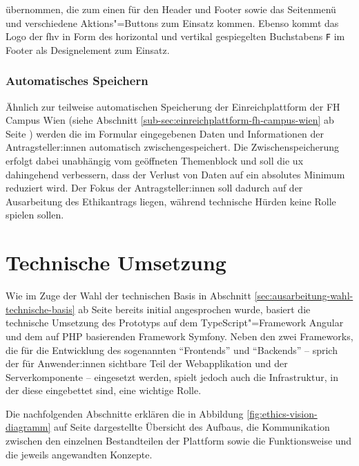 \documentclass[a4paper,12pt,twoside,numbers=noendperiod]{scrreprt}
\begin{document}
\noindent übernommen, die zum einen für den Header und Footer sowie das Seitenmenü und verschiedene Aktions"=Buttons zum Einsatz kommen. Ebenso kommt das Logo der \ac{fhv} in Form des horizontal und vertikal gespiegelten Buchstabens \texttt{F} im Footer als Designelement zum Einsatz.

\subsubsection*{Automatisches Speichern}
 \label{sub-sub-sec:automatsiches-speichern}

 Ähnlich zur teilweise automatischen Speicherung der Einreichplattform der FH Campus Wien (siehe Abschnitt \ref{sub-sec:einreichplattform-fh-campus-wien} ab Seite \pageref{sub-sec:einreichplattform-fh-campus-wien}) werden die im Formular eingegebenen Daten und Informationen der Antragsteller:innen automatisch zwischengespeichert. Die Zwischenspeicherung erfolgt dabei unabhängig vom geöffneten Themenblock und soll die \ac{ux} dahingehend verbessern, dass der Verlust von Daten auf ein absolutes Minimum reduziert wird. Der Fokus der Antragsteller:innen soll dadurch auf der Ausarbeitung des Ethikantrags liegen, während technische Hürden keine Rolle spielen sollen.

\section{Technische Umsetzung}
\label{sec:ausarbeitung-technische-umsetzung}

Wie im Zuge der Wahl der technischen Basis in Abschnitt \ref{sec:ausarbeitung-wahl-technische-basis} ab Seite \pageref{sec:ausarbeitung-wahl-technische-basis} bereits initial angesprochen wurde, basiert die technische Umsetzung des Prototyps auf dem TypeScript"=Framework Angular und dem auf PHP basierenden Framework Symfony. Neben den zwei Frameworks, die für die Entwicklung des sogenannten \enquote{Frontends} und \enquote{Backends} -- sprich der für Anwender:innen sichtbare Teil der Webapplikation und der Serverkomponente -- eingesetzt werden, spielt jedoch auch die Infrastruktur, in der diese eingebettet sind, eine wichtige Rolle.

Die nachfolgenden Abschnitte erklären die in Abbildung \ref{fig:ethics-vision-diagramm} auf Seite \pageref{fig:ethics-vision-diagramm} dargestellte Übersicht des Aufbaus, die Kommunikation zwischen den einzelnen Bestandteilen der Plattform sowie die Funktionsweise und die jeweils angewandten Konzepte.
\end{document}

